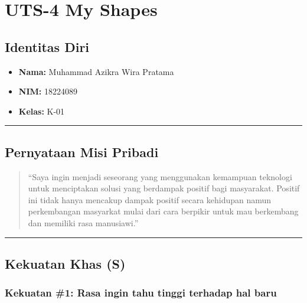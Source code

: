 \documentclass[
  letterpaper,
  DIV=11,
  numbers=noendperiod]{scrreprt}
\providecommand{\tightlist}{%
  \setlength{\itemsep}{0pt}\setlength{\parskip}{0pt}}
\begin{document}
\chapter{UTS-4 My Shapes}\label{uts-4-my-shapes}

\section{Identitas Diri}\label{identitas-diri-1}

\begin{itemize}
\tightlist
\item
  \textbf{Nama:} Muhammad Azikra Wira Pratama\\
\item
  \textbf{NIM:} 18224089
\item
  \textbf{Kelas:} K-01
\end{itemize}

\begin{center}\rule{0.5\linewidth}{0.5pt}\end{center}

\section{Pernyataan Misi Pribadi}\label{pernyataan-misi-pribadi}

\begin{quote}
``Saya ingin menjadi seseorang yang menggunakan kemampuan teknologi
untuk menciptakan solusi yang berdampak positif bagi masyarakat. Positif
ini tidak hanya mencakup dampak positif secara kehidupan namun
perkembangan masyarkat mulai dari cara berpikir untuk mau berkembang dan
memiliki rasa manusiawi.''
\end{quote}

\begin{center}\rule{0.5\linewidth}{0.5pt}\end{center}

\section{Kekuatan Khas (S)}\label{kekuatan-khas-s}

\subsection*{Kekuatan \#1: Rasa ingin tahu tinggi terhadap hal
baru}\label{kekuatan-1-rasa-ingin-tahu-tinggi-terhadap-hal-baru}
\end{document}
